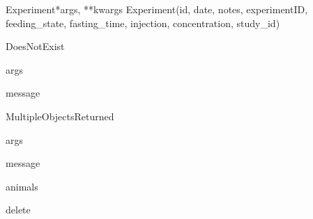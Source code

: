 \documentclass[letterpaper,10pt,english]{sphinxmanual}
\begin{document}
\hypertarget{data.models.Experiment}{}\begin{classdesc}{Experiment}{*args, **kwargs}
Experiment(id, date, notes, experimentID, feeding\_state, fasting\_time, injection, concentration, study\_id)

\hypertarget{data.models.Experiment.DoesNotExist}{}\begin{excdesc}{DoesNotExist}~

\hypertarget{data.models.Experiment.DoesNotExist.args}{}\begin{memberdesc}{args}\end{memberdesc}

\hypertarget{data.models.Experiment.DoesNotExist.message}{}\begin{memberdesc}{message}\end{memberdesc}
\end{excdesc}

\hypertarget{data.models.Experiment.MultipleObjectsReturned}{}\begin{excdesc}{MultipleObjectsReturned}~

\hypertarget{data.models.Experiment.MultipleObjectsReturned.args}{}\begin{memberdesc}{args}\end{memberdesc}

\hypertarget{data.models.Experiment.MultipleObjectsReturned.message}{}\begin{memberdesc}{message}\end{memberdesc}
\end{excdesc}

\hypertarget{data.models.Experiment.animals}{}\begin{memberdesc}[Experiment]{animals}\end{memberdesc}

\hypertarget{data.models.Experiment.delete}{}\begin{methoddesc}[Experiment]{delete}{}\end{methoddesc}


\end{classdesc}
\end{document}
